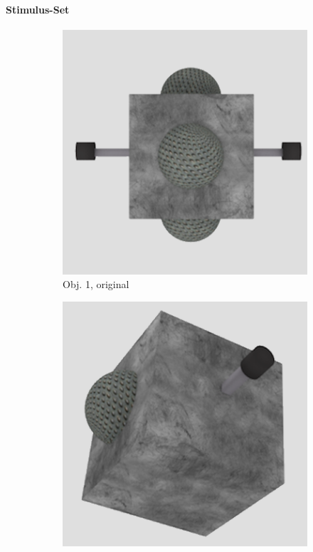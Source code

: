 \paragraph{Stimulus-Set}
\captionsetup[subfigure]{labelformat=empty}
\begin{figure}
\begin{subfigure}{0.2\textwidth}
\includegraphics[width=\linewidth]{Bilder/Objekt1A.png}
\caption{Obj. 1, original} \label{fig:c}
\end{subfigure}\hspace{.5cm} %
\begin{subfigure}{0.2\textwidth}
\includegraphics[width=\linewidth]{Bilder/Objekt1B.png}

\end{subfigure}
\end{figure}
